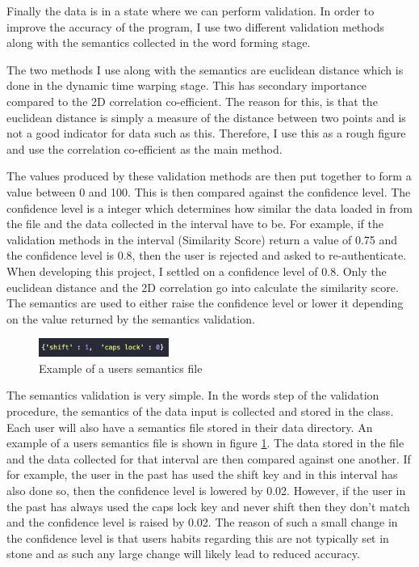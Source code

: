 \documentclass[10pt,a4paper]{report}
\begin{document}
Finally the data is in a state where we can perform validation. In order to improve the accuracy of the program, I use two different validation methods along with the semantics collected in the word forming stage. 

The two methods I use along with the semantics are euclidean distance which is done in the dynamic time warping stage. This has secondary importance compared to the 2D correlation co-efficient. The reason for this, is that the euclidean distance is simply a measure of the distance between two points and is not a good indicator for data such as this. Therefore, I use this as a rough figure and use the correlation co-efficient as the main method. 

The values produced by these validation methods are then put together to form a value between 0 and 100. This is then compared against the confidence level. The confidence level is a integer which determines how similar the data loaded in from the file and the data collected in the interval have to be. For example, if the validation methods in the interval (Similarity Score) return a value of 0.75 and the confidence level is 0.8, then the user is rejected and asked to re-authenticate. When developing this project, I settled on a confidence level of 0.8.  Only the euclidean distance and the 2D correlation go into calculate the similarity score. The semantics are used to either raise the confidence level or lower it depending on the value returned by the semantics validation.

\begin{figure}
	\begin{center}
		\includegraphics[width=0.38\textwidth]{SemanticsEx}
	\end{center}
	\caption{Example of a users semantics file}
	\label{fig:sem}
\end{figure}

The semantics validation is very simple. In the words step of the validation procedure, the semantics of the data input is collected and stored in the class. Each user will also have a semantics file stored in their data directory. An example of a users semantics file is shown in figure \ref{fig:sem}. The data stored in the file and the data collected for that interval are then compared against one another. If for example, the user in the past has used the shift key and in this interval has also done so, then the confidence level is lowered by 0.02. However, if the user in the past has always used the caps lock key and never shift then they don't match and the confidence level is raised by 0.02. The reason of such a small change in the confidence level is that users habits regarding this are not typically set in stone and as such any large change will likely lead to reduced accuracy.
\end{document}
